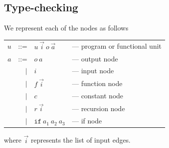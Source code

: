 \documentclass[12pt,UTF8,a4]{article}
\newcommand{\code}[1]{\texttt{#1}}
\begin{document}
\subsection{Type-checking}
We represent each of the nodes as follows
\begin{center}
  \begin{tabular}{rrll}
    $u$ & ::= & $u\ \vec{i}\ o\ \vec{a}$ & --- program or functional unit
    \\
    $a$ & ::= & $o\ a$ & --- output node
    \\
    & $|$ & $i$ &  --- input node
    \\
    & $|$ & $f\ \vec{i}$ &  --- function node
    \\
    & $|$ & $c$ &  --- constant node
    \\
    & $|$ & $r\ \vec{i}$ &  --- recursion node
    \\
    & $|$ & $\code{if}\ a_1\ a_2\ a_3$ &  --- if node
    \\
  \end{tabular}
\end{center}
where $\vec{i}$ represents the list of input edges.
\end{document}
